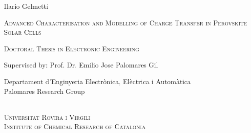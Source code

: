 \documentclass[b5paper, 12pt, openany, twoside, titlepage]{book} %
\begin{document}
\begin{titlepage}\begin{center}
		
		
		

		\bigskip
		
			\LARGE{Ilario Gelmetti}\\

		\vfill
		
		\huge{\textsc{Advanced Characterisation and Modelling of Charge Transfer in Perovskite Solar Cells}}\\
		
		\bigskip\bigskip	

					\Large{\textsc{Doctoral Thesis in Electronic Engineering}}\\


				
				\bigskip
				
				\large Supervised by:
						\Large Prof. Dr. Emilio Jose Palomares Gil %

				
		\vfill		
					\bigskip
\large {Departament d'Enginyeria Electrònica, Elèctrica i Automàtica\\
Palomares Research Group}

	\bigskip\bigskip
	
	\\%
	\medskip
	\large{\textsc{Universitat Rovira i Virgili\\ Institute of Chemical Research of Catalonia}}\\
		\bigskip
		

\end{center}
\end{titlepage}
\end{document}
